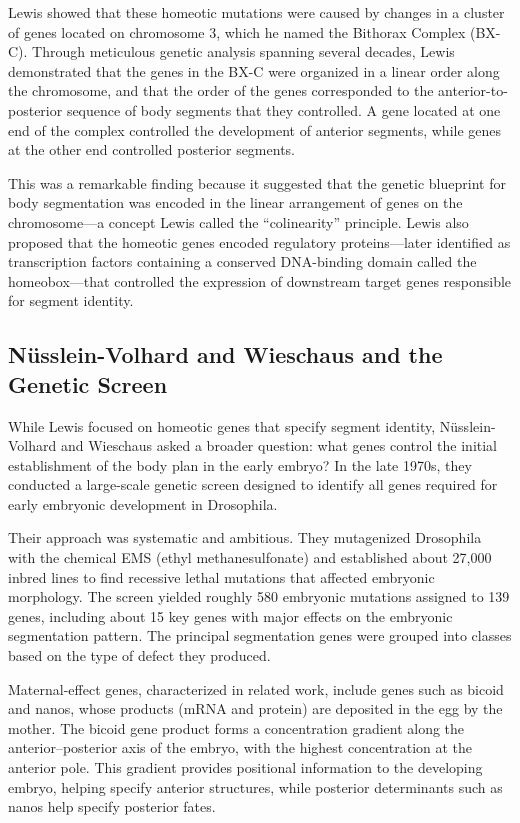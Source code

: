 Lewis showed that these homeotic mutations were caused by changes in a cluster of genes located on chromosome 3, which he named the Bithorax Complex (BX-C). Through meticulous genetic analysis spanning several decades, Lewis demonstrated that the genes in the BX-C were organized in a linear order along the chromosome, and that the order of the genes corresponded to the anterior-to-posterior sequence of body segments that they controlled. A gene located at one end of the complex controlled the development of anterior segments, while genes at the other end controlled posterior segments.

This was a remarkable finding because it suggested that the genetic blueprint for body segmentation was encoded in the linear arrangement of genes on the chromosome---a concept Lewis called the ``colinearity'' principle. Lewis also proposed that the homeotic genes encoded regulatory proteins---later identified as transcription factors containing a conserved DNA-binding domain called the homeobox---that controlled the expression of downstream target genes responsible for segment identity.

\subsection{N\"usslein-Volhard and Wieschaus and the Genetic Screen}

While Lewis focused on homeotic genes that specify segment identity, N\"usslein-Volhard and Wieschaus asked a broader question: what genes control the initial establishment of the body plan in the early embryo? In the late 1970s, they conducted a large-scale genetic screen designed to identify all genes required for early embryonic development in Drosophila.

Their approach was systematic and ambitious. They mutagenized Drosophila with the chemical EMS (ethyl methanesulfonate) and established about 27,000 inbred lines to find recessive lethal mutations that affected embryonic morphology. The screen yielded roughly 580 embryonic mutations assigned to 139 genes, including about 15 key genes with major effects on the embryonic segmentation pattern. The principal segmentation genes were grouped into classes based on the type of defect they produced.

Maternal-effect genes, characterized in related work, include genes such as bicoid and nanos, whose products (mRNA and protein) are deposited in the egg by the mother. The bicoid gene product forms a concentration gradient along the anterior--posterior axis of the embryo, with the highest concentration at the anterior pole. This gradient provides positional information to the developing embryo, helping specify anterior structures, while posterior determinants such as nanos help specify posterior fates.


